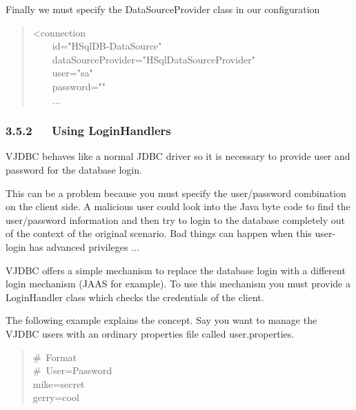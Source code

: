 \documentclass[10pt,a4paper,english]{article}
\begin{document}
Finally we must specify the DataSourceProvider class in our configuration
\begin{quote}{\ttfamily \raggedright \noindent
<connection~\\
~~~~id="HSqlDB-DataSource"~\\
~~~~dataSourceProvider="HSqlDataSourceProvider"~\\
~~~~user="sa"~\\
~~~~password="{}"~\\
~~~~...
}\end{quote}



\hypertarget{using-loginhandlers}{}
\subsubsection*{3.5.2~~~Using LoginHandlers}

VJDBC behaves like a normal JDBC driver so it is necessary to provide user and password for the database login.

This can be a problem because you must specify the user/password combination on the client side. A malicious user could look into the Java byte code to find the user/password information and then try to login to the database completely out of the context of the original scenario. Bad things can happen when this user-login has advanced privileges ...

VJDBC offers a simple mechanism to replace the database login with a different login mechanism (JAAS for example). To use this mechanism you must provide a LoginHandler class which checks the credentials of the client.

The following example explains the concept. Say you want to manage the VJDBC users with an ordinary properties file called user.properties.
\begin{quote}{\ttfamily \raggedright \noindent
{\#}~Format~\\
{\#}~User=Password~\\
mike=secret~\\
gerry=cool
}\end{quote}
\end{document}
